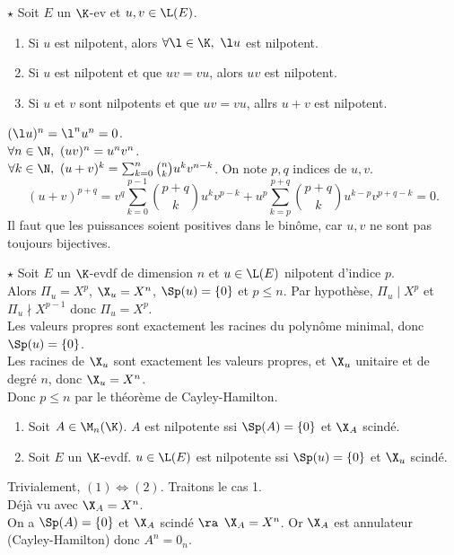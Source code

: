 \documentclass[11pt]{article}
\begin{document}
\begin{prop}{$\star$}{}
    Soit $E$ un $\K$-ev et $u,v\in\L(E)$.
    \begin{enumerate}
        \item Si $u$ est nilpotent, alors $\forall \l \in \K, ~ \l u$ est nilpotent.
        \item Si $u$ est nilpotent et que $uv=vu$, alors $uv$ est nilpotent.
        \item Si $u$ et $v$ sont nilpotents et que $uv=vu$, allrs $u+v$ est nilpotent.
    \end{enumerate}
    \tcblower
     $(\l u)^n=\l^nu^n=0$.\\
     $\forall n \in \N, ~ (uv)^n=u^nv^n$.\\
     $\forall k \in \N, ~ (u+v)^k=\sum_{k=0}^n\binom{n}{k}u^kv^{n-k}$. On note $p,q$ indices de $u,v$.
    \begin{equation*}
        (u+v)^{p+q}=v^q\sum_{k=0}^{p-1}\binom{p+q}{k}u^kv^{p-k} + u^p\sum_{k=p}^{p+q}\binom{p+q}{k}u^{k-p}v^{p+q-k} = 0.
    \end{equation*} 
    \smallwarning Il faut que les puissances soient positives dans le binôme, car $u,v$ ne sont pas toujours bijectives.
\end{prop}

\pagebreak

\begin{prop}{$\star$}{}
    Soit $E$ un $\K$-evdf de dimension $n$ et $u\in\L(E)$ nilpotent d'indice $p$.\\
    Alors $\Pi_u = X^p$, $\X_u=X^n$, $\Sp(u)=\{0\}$ et $p\leq n$.
    \tcblower
    Par hypothèse, $\Pi_u \mid X^p$ et $\Pi_u\nmid X^{p-1}$ donc $\Pi_u=X^p$.\\
    Les valeurs propres sont exactement les racines du polynôme minimal, donc $\Sp(u)=\{0\}$.\\
    Les racines de $\X_u$ sont exactement les valeurs propres, et $\X_u$ unitaire et de degré $n$, donc $\X_u=X^n$.\\
    Donc $p\leq n$ par le théorème de Cayley-Hamilton.
\end{prop}

\begin{prop}{}{}
    \begin{enumerate}
        \item Soit $A\in\M_n(\K)$. $A$ est nilpotente ssi $\Sp(A)=\{0\}$ et $\X_A$ scindé.
        \item Soit $E$ un $\K$-evdf. $u\in\L(E)$ est nilpotente ssi $\Sp(u)=\{0\}$ et $\X_u$ scindé.
    \end{enumerate}
    \tcblower
    Trivialement, $(1)\iff(2)$. Traitons le cas 1.\\
    \boxed{\ra} Déjà vu avec $\X_A=X^n$.\\
    \boxed{\la} On a $\Sp(A)=\{0\}$ et $\X_A$ scindé $\ra$ $\X_A=X^n$. Or $\X_A$ est annulateur (Cayley-Hamilton) donc $A^n=0_n$.
\end{prop}
\end{document}
